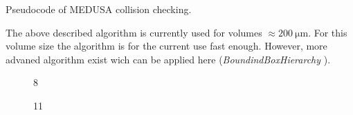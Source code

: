 % 
\begin{lstfloat}[!t]
	
	\caption{Pseudocode of \acs{MEDUSA} collision checking.}
	\label{alg:medusa_collision}
\end{lstfloat}
% 
The above described algorithm is currently used for volumes $\approx \SI{200}{\micro\meter}$. For this volume size the algorithm is for the current use fast enough. However, more advaned algorithm exist wich can be applied here (\eg \textit{BoundindBoxHierarchy} \cite{Karras2012}).
% 
\begin{figure}[!t]
    \centering
	\caption{8 \cite{Ginsburger2019}}
	\label{fig:medusa_8}
\end{figure}
% 
\begin{figure}[!t]
    \centering
	\caption{11 \cite{Ginsburger2019}}
	\label{fig:medusa_11}
\end{figure}
